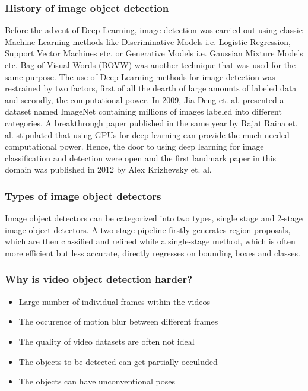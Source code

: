 \documentclass[conference]{IEEEtran}
\begin{document}
\subsubsection{History of image object detection} 
Before the advent of Deep Learning, image detection was carried out using classic Machine Learning methods like Discriminative Models i.e. Logistic Regression, Support Vector Machines etc. or Generative Models i.e. Gaussian Mixture Models etc. Bag of Visual Words (BOVW) was another technique that was used for the same purpose. The use of Deep Learning methods for image detection was restrained by two factors, first of all the dearth of large amounts of labeled data and secondly, the computational power. In 2009, Jia Deng et. al. presented a dataset named ImageNet\cite{b13} containing millions of images labeled into different categories. A breakthrough paper published in the same year by Rajat Raina\cite{b46} et. al. stipulated that using GPUs for deep learning can provide the much-needed computational power. Hence, the door to using deep learning for image classification and detection were open and the first landmark paper in this domain was published in 2012 by Alex Krizhevsky\cite{b14} et. al. \newline

\subsubsection{Types of image object detectors} 
Image object detectors can be categorized into two types, single stage and 2-stage image object detectors. A two-stage pipeline firstly generates region proposals, which are then classified and refined\cite{b17} while a single-stage method, which is often more efficient but less accurate, directly regresses on bounding boxes and classes\cite{b18}\cite{b19}. \newline

\subsubsection{Why is video object detection harder?} 
	\begin{itemize}
		\item Large number of individual frames within the videos
		\item The occurence of motion blur between different frames
		\item The quality of video datasets are often not ideal
		\item The objects to be detected can get partially occuluded
		\item The objects can have unconventional poses
	\end{itemize}
\end{document}
